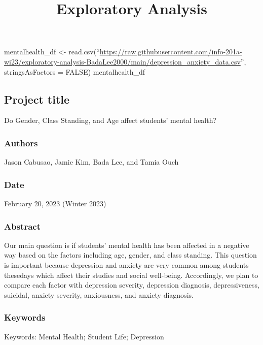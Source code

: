 \documentclass[
]{article}
\title{Exploratory Analysis}
\author{}
\date{\vspace{-2.5em}}
\begin{document}
\maketitle

mentalhealth\_df \textless-
read.csv(``\url{https://raw.githubusercontent.com/info-201a-wi23/exploratory-analysis-BadaLee2000/main/depression_anxiety_data.csv}'',
stringsAsFactors = FALSE) mentalhealth\_df

\hypertarget{project-title}{%
\subsection{Project title}\label{project-title}}

Do Gender, Class Standing, and Age affect students' mental health?

\hypertarget{authors}{%
\subsubsection{Authors}\label{authors}}

Jason Cabusao, Jamie Kim, Bada Lee, and Tamia Ouch

\hypertarget{date}{%
\subsubsection{Date}\label{date}}

February 20, 2023 (Winter 2023)

\hypertarget{abstract}{%
\subsubsection{Abstract}\label{abstract}}

Our main question is if students' mental health has been affected in a
negative way based on the factors including age, gender, and class
standing. This question is important because depression and anxiety are
very common among students thesedays which affect their studies and
social well-being. Accordingly, we plan to compare each factor with
depression severity, depression diagnosis, depressiveness, suicidal,
anxiety severity, anxiousness, and anxiety diagnosis.

\hypertarget{keywords}{%
\subsubsection{Keywords}\label{keywords}}

Keywords: Mental Health; Student Life; Depression
\end{document}
